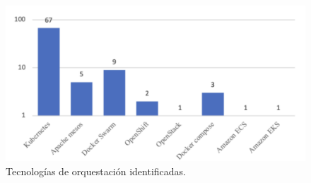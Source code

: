 \begin{figure}[H]
    \centering
    \includegraphics[scale=0.5]{./tablas-images/cp2/tecnologias-orquestacion.png}
    \caption{Tecnologías de orquestación identificadas.}\label{fig:tecnologias-orquestacion}
\end{figure}
